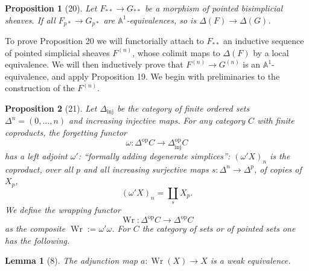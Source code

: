 \documentclass[11pt]{article}
\newcommand{\Aone}{\mathbb A^1}
\theoremstyle{deligne}
\newtheorem*{proposition*}{Proposition}
\newtheorem*{lemma*}{Lemma}
\newcommand{\Wr}{\operatorname{Wr}}
\newcommand{\inj}{\mathrm{inj}}
\newcommand{\op}{\mathrm{op}}
\begin{document}
\begin{proposition*}[20]
Let \(F_{**}\to G_{**}\) be a morphism of pointed bisimplicial sheaves. If all \(F_{p*}\to G_{p*}\) are \(\Aone\)-equivalences, so is \(\Delta(F)\to\Delta(G)\).
\end{proposition*}

To prove Proposition 20 we will functorially attach to \(F_{**}\) an inductive sequence of pointed simplicial sheaves \(F^{(n)}\), whose colimit maps to \(\Delta(F)\) by a local equivalence. We will then inductively prove that \(F^{(n)}\to G^{(n)}\) is an \(\Aone\)-equivalence, and apply Proposition 19. We begin with preliminaries to the construction of the \(F^{(n)}\).

\begin{proposition*}[21]
Let \(\Delta_{\inj}\) be the category of finite ordered sets \(\Delta^n=(0,\ldots,n)\) and increasing injective maps. For any category \(C\) with finite coproducts, the forgetting functor
\[
\omega:\Delta^{\op}C\longrightarrow \Delta^{\op}_{\inj}C
\]
has a left adjoint \(\omega'\): ``formally adding degenerate simplices'': \((\omega'X)_n\) is the coproduct, over all \(p\) and all increasing surjective maps \(s:\Delta^n\to\Delta^p\), of copies of \(X_p\),
\[
(\omega'X)_n=\coprod_s X_p.
\]
We define the wrapping functor
\[
\Wr:\Delta^{\op}C\longrightarrow\Delta^{\op}C
\]
as the composite \(\Wr:=\omega'\omega\). For \(C\) the category of sets or of pointed sets one has the following.
\end{proposition*}

\begin{lemma*}[8]
The adjunction map \(a:\Wr(X)\to X\) is a weak equivalence.
\end{lemma*}
\end{document}
